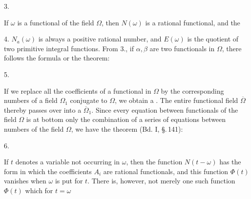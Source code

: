 
3. 

If $\omega$ is a functional of the field $\Omega$, then $N(\omega)$ is a rational
functional, and the 

4. 
$N_a(\omega)$ is always a positive rational number, and $E(\omega)$
is the quotient of two primitive integral functions. From 3.,
if $\alpha, \beta$ are two functionals in $\Omega$, there follows the formula
or the theorem:

5. 

If we replace all the coefficients of a functional in $\Omega$ by
the corresponding numbers of a field $\Omega_1$ conjugate to $\Omega$,
we obtain a . The entire
functional field $\overline{\Omega}$ thereby passes over into a
 $\overline{\Omega}_1$. Since every equation
between functionals of the field $\Omega$ is at bottom only the
combination of a series of equations between numbers of the
field $\Omega$, we have the theorem (Bd. I, \S.\,141):

6. 

If $t$ denotes a variable not occurring in $\omega$, then
the function $N(t-\omega)$ has the form
in which the coefficients $A_i$ are rational functionals, and this
function $\Phi(t)$ vanishes when $\omega$ is put for $t$. There is,
however, not merely one such function $\Phi(t)$ which for $t = \omega$
